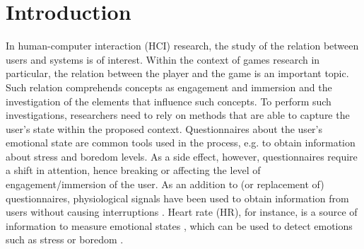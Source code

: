 \chapter{Introduction}
\label{c:introduction}

In human-computer interaction (HCI) research, the study of the relation between users and systems is of interest. Within the context of games research in particular, the relation between the player and the game is an important topic. Such relation comprehends concepts as engagement and immersion \citep{boyle2012engagement} and the investigation of the elements that influence such concepts.
To perform such investigations, researchers need to rely on methods that are able to capture the user's state within the proposed context. Questionnaires about the user's emotional state are common tools used in the process, e.g. to obtain information about stress and boredom levels.
As a side effect, however, questionnaires require a shift in attention, hence breaking or affecting the level of engagement/immersion of the user. As an addition to (or replacement of) questionnaires, physiological signals have been used to obtain information from users without causing interruptions \citep{bousefsaf2013remote,yun2009game,rani2006empirical,tijs2008dynamic}. Heart rate (HR), for instance, is a source of information to measure emotional states \citep{kivikangas2011review}, which can be used to detect emotions such as stress \citep{choi2009using} or boredom \citep{yamakoshi2007preliminary}.

